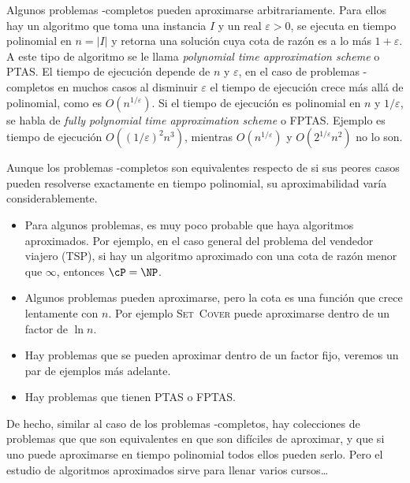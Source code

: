   Algunos problemas \NP\nobreakdash-completos
  pueden aproximarse arbitrariamente.
  Para ellos hay un algoritmo
  que toma una instancia \(I\) y un real \(\varepsilon > 0\),
  se ejecuta en tiempo polinomial en \(n = \lvert I \rvert\)
  y retorna una solución cuya cota de razón es a lo más \(1 + \varepsilon\).
  A este tipo de algoritmo se le llama
  \emph{\foreignlanguage{english}{polynomial time approximation scheme}}
  o PTAS.
  El tiempo de ejecución depende de \(n\) y \(\varepsilon\),
  en el caso de problemas \NP\nobreakdash-completos
  en muchos casos al disminuir \(\varepsilon\)
  el tiempo de ejecución crece más allá de polinomial,
  como es \(O(n^{1/\varepsilon})\).
  Si el tiempo de ejecución es polinomial en \(n\) y \(1/\varepsilon\),
  se habla de
    \emph{\foreignlanguage{english}
                          {fully polynomial time approximation scheme}}
  o FPTAS.
  Ejemplo es tiempo de ejecución \(O((1/\varepsilon)^2 n^3)\),
  mientras \(O(n^{1/\varepsilon})\) y \(O(2^{1/\varepsilon} n^2)\) no lo son.

  Aunque los problemas \NP\nobreakdash-completos son equivalentes
  respecto de si sus peores casos
  pueden resolverse exactamente en tiempo polinomial,
  su aproximabilidad varía considerablemente.
  \begin{itemize}
  \item
    Para algunos problemas,
    es muy poco probable que haya algoritmos aproximados.
    Por ejemplo,
    en el caso general del problema del vendedor viajero
    (\textsc{TSP}),
    si hay un algoritmo aproximado con una cota de razón menor que \(\infty\),
    entonces \(\cP = \NP\).
  \item
    Algunos problemas pueden aproximarse,
    pero la cota es una función que crece lentamente con \(n\).
    Por ejemplo
    \textsc{Set~Cover}
    puede aproximarse dentro de un factor de \(\ln n\).
  \item
    Hay problemas que se pueden aproximar dentro de un factor fijo,
    veremos un par de ejemplos más adelante.
  \item
    Hay problemas que tienen PTAS o FPTAS.
  \end{itemize}
  De hecho,
  similar al caso de los problemas \NP\nobreakdash-completos,
  hay colecciones de problemas que  que son equivalentes
  en que son difíciles de aproximar,
  y que si uno puede aproximarse en tiempo polinomial
  todos ellos pueden serlo.
  Pero el estudio de algoritmos aproximados
  sirve para llenar varios cursos\ldots

